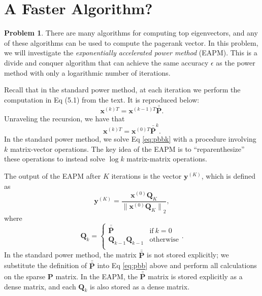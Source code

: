 \documentclass[10pt]{exam}
\theoremstyle{definition}
\newtheorem{problem}{Problem}
\newcommand{\Q}{\mathbf Q}
\newcommand{\p}{\mathbf P}
\newcommand{\pb}{\bar {\p}}
\newcommand{\pbb}{\bar {\pb}}
\newcommand{\x}{\mathbf x}
\newcommand{\y}{\mathbf y}
\newcommand{\ltwo}[1]{{\lVert {#1} \rVert}_2}
\begin{document}
\newpage
\section{A Faster Algorithm?}

\begin{problem}
    There are many algorithms for computing top eigenvectors,
    and any of these algorithms can be used to compute the pagerank vector.
    In this problem, we will investigate the \emph{exponentially accelerated power method} (EAPM).
    This is a divide and conquer algorithm that can achieve the same accuracy $\epsilon$ as the power method with only a logarithmic number of iterations.

    Recall that in the standard power method, at each iteration we perform the computation in Eq (5.1) from the text.
    It is reproduced below:
    \begin{equation}
        \label{eq:pbb}
        \x^{(k)T} = {\x^{(k-1)T}} \pbb
        .
    \end{equation}
    Unraveling the recursion, we have that
    \begin{equation}
        \label{eq:pbbk}
        \x^{(k)T} = {\x^{(0)T}} \pbb^k
        .
    \end{equation}
    In the standard power method, we solve Eq \eqref{eq:pbbk} with a procedure involving $k$ matrix-vector operations.
    The key idea of the EAPM is to ``reparenthesize'' these operations to instead solve $\log k$ matrix-matrix operations.


    The output of the EAPM after $K$ iterations is the vector $\y^{(K)}$, which is defined as
    \begin{equation}
        \label{eq:exp:y}
        \y^{(K)} = \frac{\x^{(0)} \Q_K}{\ltwo{\x^{(0)} \Q_K}}
        ,
    \end{equation}
    where
    \begin{equation}
        \label{eq:Qk}
        \Q_k = 
        \begin{cases}
            \pbb & \text{if}~k=0 \\
            \Q_{k-1} \Q_{k-1} & \text{otherwise} \\
        \end{cases}
        .
    \end{equation}
    In the standard power method, the matrix $\pbb$ is not stored explicitly;
    we substitute the definition of $\pbb$ into Eq \eqref{eq:pbb} above and perform all calculations on the sparse $\p$ matrix.
    In the EAPM, the $\pbb$ matrix is stored explicitly as a dense matrix,
    and each $\Q_k$ is also stored as a dense matrix.


\end{problem}
\end{document}
